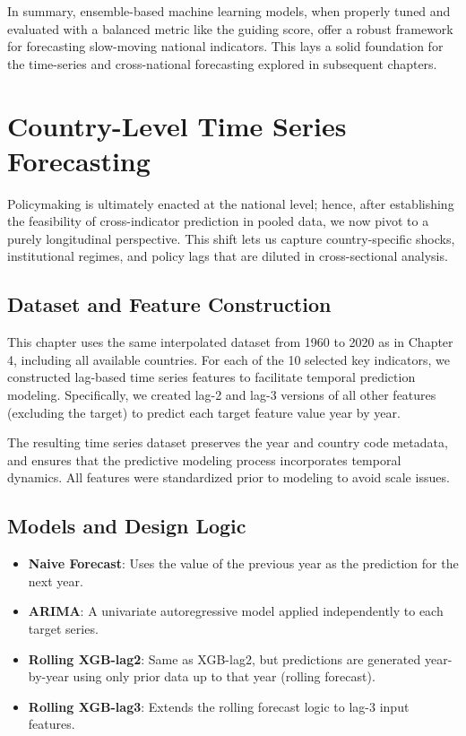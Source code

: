 \documentclass[12pt]{article}
\begin{document}
In summary, ensemble-based machine learning models, when properly tuned and evaluated with a balanced metric like the guiding score, offer a robust framework for forecasting slow-moving national indicators. This lays a solid foundation for the time-series and cross-national forecasting explored in subsequent chapters.


\section{Country-Level Time Series Forecasting}

Policymaking is ultimately enacted at the national level;  
hence, after establishing the feasibility of cross-indicator prediction in pooled data, we now pivot to a purely longitudinal perspective.  
This shift lets us capture country-specific shocks, institutional regimes, and policy lags that are diluted in cross-sectional analysis.

\subsection{Dataset and Feature Construction}

This chapter uses the same interpolated dataset from 1960 to 2020 as in Chapter 4, including all available countries. For each of the 10 selected key indicators, we constructed lag-based time series features to facilitate temporal prediction modeling. Specifically, we created lag-2 and lag-3 versions of all other features (excluding the target) to predict each target feature value year by year.

The resulting time series dataset preserves the year and country code metadata, and ensures that the predictive modeling process incorporates temporal dynamics. All features were standardized prior to modeling to avoid scale issues.

\subsection{Models and Design Logic}

\begin{itemize}
    \item \textbf{Naive Forecast}: Uses the value of the previous year as the prediction for the next year.
    \item \textbf{ARIMA}: A univariate autoregressive model applied independently to each target series.
    \item \textbf{Rolling XGB-lag2}: Same as XGB-lag2, but predictions are generated year-by-year using only prior data up to that year (rolling forecast).
    \item \textbf{Rolling XGB-lag3}: Extends the rolling forecast logic to lag-3 input features.
\end{itemize}
\end{document}
